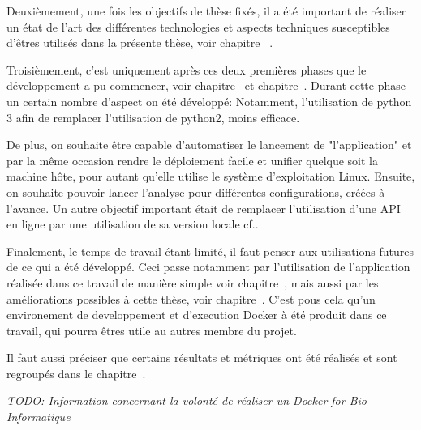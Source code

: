 Deuxièmement, une fois les objectifs de thèse fixés, il a été important de réaliser un état de l'art des différentes technologies et aspects techniques susceptibles d'êtres utilisés dans la présente thèse, voir chapitre~ .

Troisièmement, c'est uniquement après ces deux premières phases que le développement a pu commencer, voir chapitre~ et chapitre~.
Durant cette phase un certain nombre d'aspect on été développé:
Notamment, l'utilisation de python 3 afin de remplacer l'utilisation de python2, moins efficace.

De plus, on souhaite être capable d'automatiser le lancement de "l'application" et par la même occasion rendre le déploiement facile et unifier quelque soit la machine hôte, pour autant qu'elle utilise le système d'exploitation Linux. Ensuite, on souhaite pouvoir lancer l'analyse pour différentes configurations, créées à l'avance. Un autre objectif important était de remplacer l'utilisation d'une API en ligne par une utilisation de sa version locale cf..

Finalement, le temps de travail étant limité, il faut penser aux utilisations futures de ce qui a été développé. Ceci passe notamment par l'utilisation de l'application réalisée dans ce travail de manière simple voir chapitre~, mais aussi par les améliorations possibles à cette thèse, voir chapitre~. C'est pous cela qu'un environement de developpement et d'execution Docker à été produit dans ce travail, qui pourra êtres utile au autres membre du projet. 

Il faut aussi préciser que certains résultats et métriques ont été réalisés et sont regroupés dans le chapitre~.

\emph{TODO: Information concernant la volonté de réaliser un Docker for Bio-Informatique}
